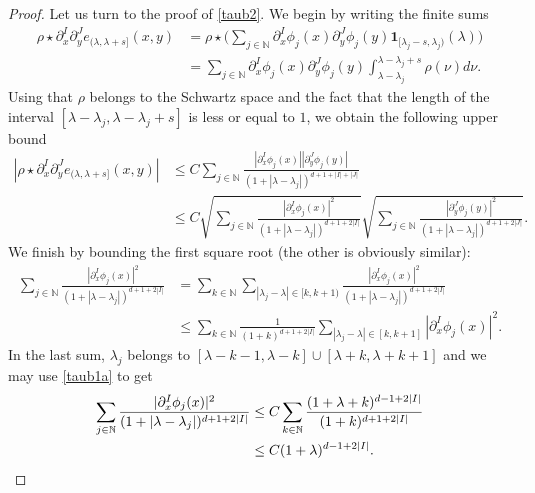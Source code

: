 \documentclass[JEP,XML,SOM,Unicode,NoEqCountersInSection,published]{cedram}
\theoremstyle{theorem}
\theoremstyle{definition}
\newcommand\N{\mathbb{N}}
\newcommand\pun{\mathbf{1}}
\begin{document}
\begin{proof}
Let us turn to the proof of \eqref{taub2}. We begin by writing the finite sums
\begin{align*}
\rho \star \partial_x^I \partial_y^J e_{(\lambda,\lambda+s]}(x,y) & = \rho \star \biggl(\sum_{j\in \N} \partial_x^I \phi_j(x) \partial_y^J \phi_j (y) \pun_{[\lambda_j-s,\lambda_j)}(\lambda) \biggr)\\
& = \sum_{j\in \N} \partial_x^I \phi_j(x)\partial_y^J\phi_j(y) \int_{\lambda-\lambda_j}^{\lambda-\lambda_j+s} \rho(\nu)d\nu .
\end{align*}
Using that $\rho$ belongs to the Schwartz space and the fact that the length of the interval $[\lambda-\lambda_j,\lambda-\lambda_j+s]$ is less or equal to $1$, we obtain the following upper bound
\begin{align*}
|\rho \star \partial_x^I \partial_y^J e_{(\lambda,\lambda+s]}(x,y)| & \leq  C\sum_{j\in \N} \frac{|\partial_x^{I} \phi_j(x)||\partial_y^J \phi_j(y)|}{(1+|\lambda-\lambda_j|)^{d+1+|I|+|J|}}\\
& \leq C \sqrt{\sum_{j\in \N} \frac{|\partial_x^{I} \phi_j(x)|^2}{(1+|\lambda-\lambda_j|)^{d+1+2|I|}}}
\sqrt{\sum_{j\in \N} \frac{|\partial_y^{J} \phi_j(y)|^2}{(1+|\lambda-\lambda_j|)^{d+1+
2|J|}}}.
\end{align*}
We finish by bounding the first square root (the other is obviously similar):
\begin{align*}
\sum_{j\in \N} \frac{|\partial_x^{I} \phi_j(x)|^2}{(1+|\lambda-\lambda_j|)^{d+1+2|I|}} &=
\sum_{k\in \N} \sum_{|\lambda_j-\lambda|\in [k,k+1)} \frac{|\partial_x^{I} \phi_j(x)|^2}{(1+|\lambda-\lambda_j|)^{d+1+2|I|}} \\
& \leq \sum_{k\in \N}\frac{1}{(1+k)^{d+1+2|I|}} \sum_{|\lambda_j-\lambda|\in [k,k+1]}|\partial_x^{I} \phi_j(x)|^2.
\end{align*}
In the last sum, $\lambda_j$ belongs to $[\lambda-k-1,\lambda-k]\cup[\lambda+k,\lambda+k+1]$ and we may use \eqref{taub1a} to get
\begin{align*}
\sum_{j\in \N} \frac{|\partial_x^{I} \phi_j(x)|^2}{(1+|\lambda-\lambda_j|)^{d+1+2|I|}} &\leq C \sum_{k\in \N}\frac{(1+\lambda+k)^{d-1+2|I|}}{(1+k)^{d+1+2|I|}}\\
& \leq C (1+\lambda)^{d-1+2|I|}.\qedhere
\end{align*}
\end{proof}




\end{document}
